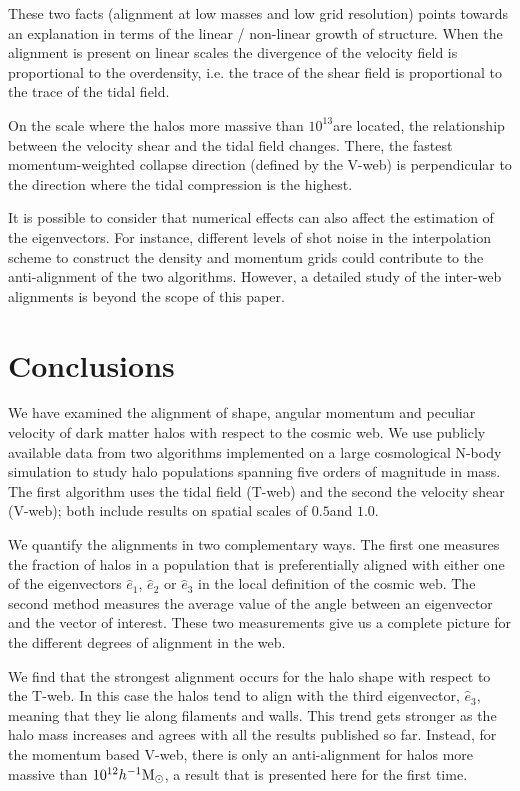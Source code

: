 \documentclass[useAMS,usenatbib]{mn2e}
\newcommand{\hMpc}{{\ifmmode{h^{-1}{\rm Mpc}}\else{$h^{-1}$Mpc }\fi}}
\newcommand{\hMsun}{{\ifmmode{h^{-1}{\rm
        {M_{\odot}}}}\else{$h^{-1}{\rm{M_{\odot}}}$~}\fi}}
\begin{document}
These two facts (alignment at low masses and low grid resolution)
points towards an explanation in terms of the  linear / non-linear
growth of structure. When the alignment is present on linear scales
the divergence of the velocity field is proportional to the
overdensity, i.e. the trace of the shear field is proportional to the
trace of the tidal field.

On the scale where the halos more massive than $10^{13}$\hMsun are
located, the relationship between the velocity shear and the tidal
field changes. There, the fastest momentum-weighted collapse direction
(defined by the V-web) is perpendicular to the direction where the
tidal compression is the highest. 

It is possible to consider that numerical effects can also
affect the estimation of the eigenvectors. For instance,
different levels of shot noise in the interpolation scheme to
construct the density and momentum grids could contribute to the
anti-alignment of the two algorithms. However, a detailed study of the
inter-web alignments is beyond the scope of this paper.


\section{Conclusions}
\label{sec:conclusions}

We have examined the alignment of shape, angular momentum and peculiar
velocity of dark matter halos with respect to the cosmic web. We use
publicly available data from two algorithms implemented on a large
cosmological N-body simulation to study halo populations spanning five
orders of magnitude in mass. The first algorithm uses the tidal field (T-web)
and the second the velocity shear (V-web); both include results on
spatial scales of $0.5$\hMpc and $1.0$\hMpc.   

We quantify the alignments in two complementary ways. The first one
measures the fraction of halos in a population that is preferentially
aligned with either one of the eigenvectors $\hat{e}_1$, $\hat{e}_2$
or $\hat{e}_3$ in the local definition of the cosmic web. The second
method measures the average value of the angle between an eigenvector
and the vector of interest. These two measurements give us a
complete picture for the different degrees of alignment in the web.

We find that the strongest alignment occurs for the halo shape with
respect to the T-web. In this case the halos tend to align with the
third eigenvector, $\hat{e}_3$, meaning that they lie along filaments
and walls. This trend gets stronger as the halo mass
increases and agrees with all the results published so far. Instead,
for the momentum based V-web, there is only an anti-alignment for halos
more massive than $10^{12}\hMsun$, a result that is presented here for
the first time. 
\end{document}
